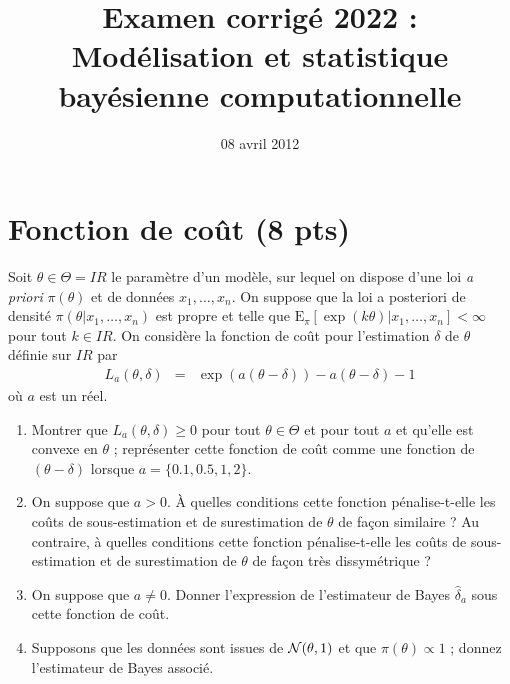 \documentclass[10pt]{article}
\title{Examen corrig\'e 2022 : Mod\'elisation et statistique bay\'esienne computationnelle }
\date{08 avril 2012}
\newcommand{\R}{I\!\!R}
\newcommand{\E}{\mbox{E}}
\newcommand{\1}{\mathbbm{1}}
\begin{document}
\maketitle

 

\section{Fonction de co\^ut (8 pts) }

Soit $\theta\in\Theta=\R$ le param\`etre d'un mod\`ele, sur lequel on dispose d'une loi {\it a priori} $\pi(\theta)$ et de donn\'ees $x_1,\ldots,x_n$. On suppose que la loi a posteriori de densit\'e  $\pi(\theta|x_1,\ldots,x_n)$ est propre et telle que $\E_{\pi}[\exp(k\theta)|x_1,\ldots,x_n]<\infty$ pour tout $k\in\R$. On consid\`ere la fonction de co\^ut pour l'estimation $\delta$ de $\theta$ d\'efinie sur $\R$ par
\begin{eqnarray*}
L_a(\theta,\delta) & = & \exp(a(\theta-\delta)) - a(\theta-\delta) - 1
\end{eqnarray*}
o\`u $a$ est un r\'eel.
\begin{enumerate}
\item Montrer que $L_a(\theta,\delta)\geq 0$ pour tout $\theta\in\Theta$ et pour tout $a$ et qu'elle est convexe en $\theta$ ; repr\'esenter cette fonction de co\^ut comme une fonction de $(\theta-\delta)$ lorsque $a=\{0.1, 0.5, 1,2\}$. 
\item On suppose que $a>0$. \`A quelles conditions cette fonction p\'enalise-t-elle les co\^uts de sous-estimation et de surestimation de $\theta$ de fa\c con similaire ? Au contraire, \`a quelles conditions cette fonction p\'enalise-t-elle les co\^uts de sous-estimation et de surestimation de $\theta$ de fa\c con tr\`es dissym\'etrique ? 
\item On suppose que $a\neq 0$. Donner l'expression de l'estimateur de Bayes $\hat{\delta}_a$ sous cette fonction de co\^ut.
\item Supposons que les donn\'ees sont issues de ${\cal{N}}(\theta,1)$ et que $\pi(\theta)\propto 1$ ; donnez l'estimateur de Bayes associ\'e.
\end{enumerate}
\end{document}
